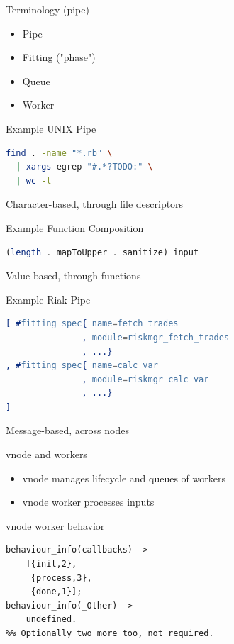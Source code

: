 \documentclass[compress]{beamer}
\begin{document}
\begin{frame}{Terminology (pipe)}
\begin{itemize}
  \item Pipe
  \item Fitting ("phase")
  \item Queue
  \item Worker
\end{itemize}
\end{frame}

\begin{frame}[containsverbatim]{Example UNIX Pipe}
\begin{lstlisting}[language=bash]
find . -name "*.rb" \
  | xargs egrep "#.*?TODO:" \
  | wc -l
\end{lstlisting}
  \small{Character-based, through file descriptors}
\end{frame}

\begin{frame}[containsverbatim]{Example Function Composition}
\begin{lstlisting}[language=haskell]
(length . mapToUpper . sanitize) input
\end{lstlisting}
  \small{Value based, through functions}
\end{frame}

\begin{frame}[containsverbatim]{Example Riak Pipe}
\begin{lstlisting}[language=erlang]
[ #fitting_spec{ name=fetch_trades
               , module=riskmgr_fetch_trades
               , ...}
, #fitting_spec{ name=calc_var
               , module=riskmgr_calc_var
               , ...}
]
\end{lstlisting}
  \small{Message-based, across nodes}
\end{frame}

\begin{frame}{vnode and workers}
  \begin{itemize}
    \item \Large{vnode} \newline \small{manages lifecycle and queues of workers} \newline
    \item \Large{vnode worker} \newline \small{processes inputs}
  \end{itemize}
\end{frame}

\begin{frame}[containsverbatim]{vnode worker behavior}
\begin{lstlisting}
behaviour_info(callbacks) ->
    [{init,2},
     {process,3},
     {done,1}];
behaviour_info(_Other) ->
    undefined.
%% Optionally two more too, not required.
\end{lstlisting}
\end{frame}
\end{document}
